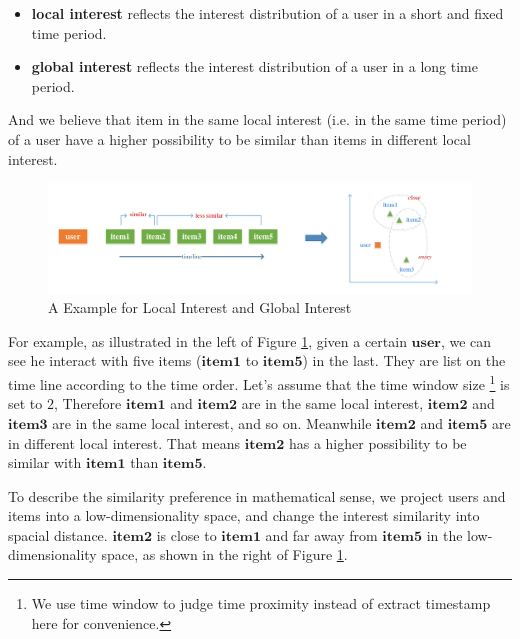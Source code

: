 \documentclass{sig-alternate-05-2015}
\begin{document}
\begin{itemize}
\item \textbf{local interest} reflects the interest distribution of a user
in a short and fixed time period.
\item \textbf{global interest} reflects the interest distribution of a user
in a long time period.
\end{itemize}

And we believe that item in the same local interest (i.e. in the same time period)
of a user have a higher possibility to be similar than
items in different local interest.

\begin{figure}[htbp]
	\centering
	\includegraphics[scale=0.6]{images/1.pdf}
	\caption{A Example for Local Interest and Global Interest}
	\label{fig:example}
\end{figure}

For example, as illustrated in the left of Figure \ref{fig:example},
given a certain $\mathbf{user}$, we can see he interact with five items
($\mathbf{item1}$ to $\mathbf{item5}$) in the last.
They are list on the time line according to the time order.
Let's assume that the time window size \footnote{We use time window to judge time proximity
instead of extract timestamp here for convenience.} is set to $2$,
Therefore $\mathbf{item1}$ and $\mathbf{item2}$ are in the same local interest,
$\mathbf{item2}$ and $\mathbf{item3}$ are in the same local interest, and so on.
Meanwhile $\mathbf{item2}$ and $\mathbf{item5}$ are in different local interest.
That means $\mathbf{item2}$ has a higher possibility to be similar with $\mathbf{item1}$
than $\mathbf{item5}$.

To describe the similarity preference in mathematical sense,
we project users and items into a low-dimensionality space,
and change the interest similarity into spacial distance.
$\mathbf{item2}$ is close to $\mathbf{item1}$ and far away from $\mathbf{item5}$
in the low-dimensionality space, as shown in the right of Figure \ref{fig:example}.
\end{document}
